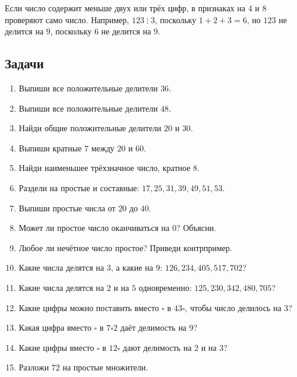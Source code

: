 \documentclass[12pt,a4paper]{article}
\theoremstyle{definition}
\theoremstyle{plain}
\theoremstyle{remark}
\begin{document}
Если число содержит меньше двух или трёх цифр, в признаках на \(4\) и \(8\) проверяют само число.
Например, \(123\mathrel{\vdots}3\), поскольку \(1+2+3=6\),
но \(123\) не делится на \(9\), поскольку \(6\) не делится на \(9\).
\subsection*{Задачи}
\begin{enumerate}[label=\thesection.\arabic*.,leftmargin=2.8em,itemsep=12pt]
\item Выпиши все положительные делители \(36\).
\item Выпиши все положительные делители \(48\).
\item Найди общие положительные делители \(20\) и \(30\).
\item Выпиши кратные \(7\) между \(20\) и \(60\).
\item Найди наименьшее трёхзначное число, кратное \(8\).
\item Раздели на простые и составные: \(17,\allowbreak 25,\allowbreak 31,\allowbreak 39,\allowbreak 49,\allowbreak 51,\allowbreak 53\).
\item Выпиши простые числа от \(20\) до \(40\).
\item Может ли простое число оканчиваться на \(0\)? Объясни.
\item Любое ли нечётное число простое? Приведи контрпример.
\item Какие числа делятся на \(3\), а какие на \(9\): \(126,\allowbreak 234,\allowbreak 405,\allowbreak 517,\allowbreak 702\)?
\item Какие числа делятся на \(2\) и на \(5\) одновременно: \(125,\allowbreak 230,\allowbreak 342,\allowbreak 480,\allowbreak 705\)?
\item Какие цифры можно поставить вместо \(\square \) в \(43 \square \), чтобы число делилось на \(3\)?
\item Какая цифра вместо \(\square \) в \(7 \square  2\) даёт делимость на \(9\)?
\item Какие цифры вместо \(\square \) в \(12 \square \) дают делимость на \(2\) и на \(3\)?
\item Разложи \(72\) на простые множители.

\end{enumerate}
\end{document}
